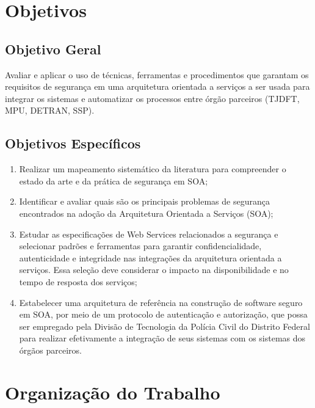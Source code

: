 \section{Objetivos}\label{sec:Obj}
\subsection{Objetivo Geral}

Avaliar e aplicar o uso de técnicas, ferramentas  e procedimentos que garantam os requisitos de segurança em uma arquitetura orientada a serviços a ser usada para integrar os sistemas e automatizar os processos entre órgão parceiros (TJDFT, MPU, DETRAN, SSP).

\subsection{Objetivos Espec\'ificos}

\begin{enumerate}[a )]
	\item Realizar um mapeamento sistemático da literatura para compreender o estado da arte e da prática de segurança em SOA;

	\item Identificar e avaliar quais são os principais problemas de segurança encontrados na adoção da Arquitetura Orientada a Serviços (SOA);

	\item Estudar as especificações de Web Services relacionados a segurança e selecionar padrões e ferramentas para garantir confidencialidade, autenticidade e integridade nas integrações da arquitetura orientada a serviços. Essa seleção deve considerar o impacto na disponibilidade e no tempo de resposta dos serviços;

    \item Estabelecer uma arquitetura de referência na construção de software seguro em  SOA, por meio de um protocolo de autenticação e autorização, que possa ser empregado pela Divisão de Tecnologia da Polícia Civil do Distrito Federal para realizar efetivamente a integração de seus sistemas com os sistemas dos órgãos parceiros.

\end{enumerate}

\section{Organização do Trabalho}

